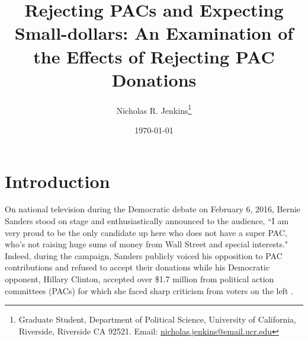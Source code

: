 \documentclass[12pt]{article}
\title{\textbf{Rejecting PACs and Expecting Small-dollars: An Examination of the Effects of Rejecting PAC Donations}}
\author{Nicholas R. Jenkins\thanks{Graduate Student, Department of Political Science, University of California, Riverside, Riverside CA 92521. Email: \href{mailto:nicholas.jenkins@email.ucr.edu}{nicholas.jenkins@email.ucr.edu}}}
\date{\today}
\begin{document}
\maketitle
\thispagestyle{empty}

\pagebreak

\cleardoublepage
\setcounter{page}{1}



\section{Introduction} \label{sec: intro}


On national television during the Democratic debate on February 6, 2016, Bernie Sanders stood on stage and enthusiastically announced to the audience, ``I am very proud to be the only candidate up here who does not have a super PAC, who’s not raising huge sums of money from Wall Street and special interests." Indeed, during the campaign, Sanders publicly voiced his opposition to PAC contributions and refused to accept their donations while his Democratic opponent, Hillary Clinton, accepted over \$1.7 million from political action committees (PACs) for which she faced sharp criticism from voters on the left \citep{harper_2020_2019, ye_hee_lee_sanderss_2016, seitz-wald_promise_2015, bump_why_2016}. 
\end{document}
